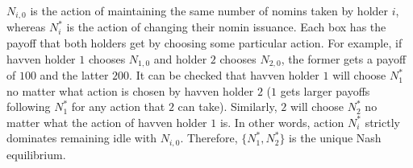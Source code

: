 \noindent $N_{i,0}$ is the action of maintaining the same number of nomins taken by holder $i$, whereas $N_i^*$ is the action of changing their nomin issuance. Each box has the payoff that both holders get by choosing some particular action. For example, if havven holder $1$ chooses $N_{1,0}$ and holder $2$ chooses $N_{2,0}$, the former gets a payoff of $100$ and the latter $200$. It can be checked that havven holder $1$ will choose $N_{1}^*$ no matter what action is chosen by havven holder $2$ ($1$ gets larger payoffs following $N_{1}^*$ for any action that $2$ can take). Similarly, $2$ will choose $N_{2}^*$ no matter what the action of havven holder $1$ is. In other words, action $N_i^*$ strictly dominates remaining idle with $N_{i,0}$. Therefore, $\{N_1^*,N_2^*\}$ is the unique Nash equilibrium. \\